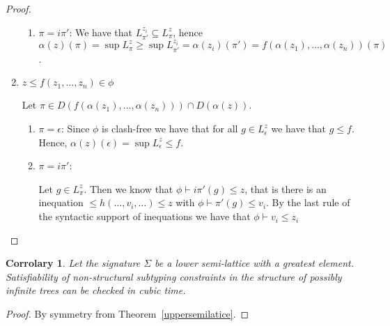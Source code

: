 \documentclass[11pt]{article}
\newtheorem{corr}{Corrolary}
\begin{document}
\begin{proof}
\begin{enumerate}
\begin{enumerate}
\item $\pi = i\pi'$:
We have that $L^{z_i}_{\pi'} \subseteq L^z_{\pi}$, hence
$\alpha(z)(\pi) = \sup L^z_{\pi} \geq \sup L^{z_i}_{\pi'} =
\alpha(z_i)(\pi') = f(\alpha(z_1),\ldots,\alpha(z_n))(\pi)$.

\end{enumerate}

\item $z \leq f(z_1,\ldots,z_n) \in \phi$

Let $\pi \in D(f(\alpha(z_1),\ldots,\alpha(z_n))) \cap
D(\alpha(z))$.
\begin{enumerate}

\item $\pi=\epsilon$:
Since $\phi$ is clash-free we have that for all $g \in L^z_\epsilon$
we have that $g\leq f$. Hence, $\alpha(z)(\epsilon) = \sup
L^z_\epsilon \leq f$.

\item $\pi = i\pi'$:
  
  Let $g\in L^z_\pi$. Then we know that $\phi \vdash i\pi'(g) \leq z$,
  that is there is an inequation $\leq h(\ldots,v_i,\ldots)\leq z$ with
  $\phi \vdash \pi'(g) \leq v_i$. By the last rule of the syntactic
  support of inequations we have that $\phi \vdash v_i \leq z_i$

\end{enumerate}

\end{enumerate}
\end{proof}

\begin{corr}
\label{lowersemilattice}
Let the signature $\Sigma$ be a lower semi-lattice with a greatest
element. Satisfiability of non-structural subtyping constraints in the
structure of possibly infinite trees can be checked in cubic time.
\end{corr}

\begin{proof}
By symmetry from Theorem~\ref{uppersemilatice}.
\end{proof}
\end{document}
